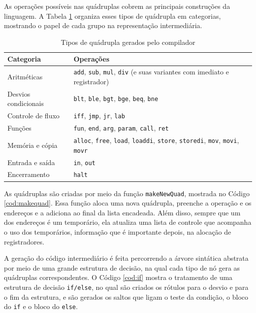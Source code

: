 \documentclass[
	12pt,				%
	oneside,
	a4paper,			%
	english,			%
	french,				%
	spanish,			%
	brazil,				%
	]{abntex2}
\begin{document}


As operações possíveis nas quádruplas cobrem as principais construções da linguagem. A Tabela \ref{tab:quad} organiza esses tipos de quádrupla em categorias, mostrando o papel de cada grupo na representação intermediária.

\begin{table}[H]
\centering
\caption{Tipos de quádrupla gerados pelo compilador}
\label{tab:quad}
\begin{tabular}{|l|l|}
\hline
\textbf{Categoria} & \textbf{Operações} \\
\hline
Aritméticas & \texttt{add}, \texttt{sub}, \texttt{mul}, \texttt{div} (e suas variantes com imediato e registrador) \\
\hline
Desvios condicionais & \texttt{blt}, \texttt{ble}, \texttt{bgt}, \texttt{bge}, \texttt{beq}, \texttt{bne} \\
\hline
Controle de fluxo & \texttt{iff}, \texttt{jmp}, \texttt{jr}, \texttt{lab} \\
\hline
Funções & \texttt{fun}, \texttt{end}, \texttt{arg}, \texttt{param}, \texttt{call}, \texttt{ret} \\
\hline
Memória e cópia & \texttt{alloc}, \texttt{free}, \texttt{load}, \texttt{loaddi}, \texttt{store}, \texttt{storedi}, \texttt{mov}, \texttt{movi}, \texttt{movr} \\
\hline
Entrada e saída & \texttt{in}, \texttt{out} \\
\hline
Encerramento & \texttt{halt} \\
\hline
\end{tabular}
\end{table}

As quádruplas são criadas por meio da função \texttt{makeNewQuad}, mostrada no Código \ref{cod:makequad}. Essa função aloca uma nova quádrupla, preenche a operação e os endereços e a adiciona ao final da lista encadeada. Além disso, sempre que um dos endereços é um temporário, ela atualiza uma lista de controle que acompanha o uso dos temporários, informação que é importante depois, na alocação de registradores.



A geração do código intermediário é feita percorrendo a árvore sintática abstrata por meio de uma grande estrutura de decisão, na qual cada tipo de nó gera as quádruplas correspondentes. O Código \ref{cod:if} mostra o tratamento de uma estrutura de decisão \texttt{if/else}, no qual são criados os rótulos para o desvio e para o fim da estrutura, e são gerados os saltos que ligam o teste da condição, o bloco do \texttt{if} e o bloco do \texttt{else}.
\end{document}
